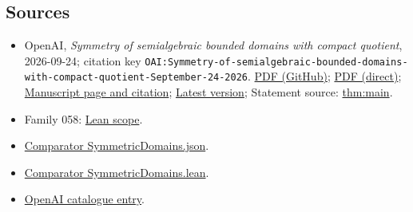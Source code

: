 \documentclass[11pt]{article}
\begin{document}
\subsection{Sources}
\begin{itemize}
\item OpenAI, \emph{Symmetry of semialgebraic bounded domains with compact quotient}, 2026-09-24; citation key \texttt{OAI:Symmetry-of-semialgebraic-bounded-domains-with-compact-quotient-September-24-2026}. \href{https://github.com/openai/math/blob/adc7f1241b42e322a6451854ab7e4b4c146bf78a/preprints/Symmetry-of-semialgebraic-bounded-domains-with-compact-quotient-September-24-2026/paper.pdf}{PDF (GitHub)}; \href{https://github.com/openai/math/raw/adc7f1241b42e322a6451854ab7e4b4c146bf78a/preprints/Symmetry-of-semialgebraic-bounded-domains-with-compact-quotient-September-24-2026/paper.pdf}{PDF (direct)}; \href{https://github.com/openai/math/blob/adc7f1241b42e322a6451854ab7e4b4c146bf78a/preprints/Symmetry-of-semialgebraic-bounded-domains-with-compact-quotient-September-24-2026/README.md}{Manuscript page and citation}; \href{https://github.com/openai/math/blob/main/preprints/Symmetry-of-semialgebraic-bounded-domains-with-compact-quotient-September-24-2026/paper.pdf}{Latest version}; Statement source: \href{https://github.com/openai/math/blob/adc7f1241b42e322a6451854ab7e4b4c146bf78a/preprints/Symmetry-of-semialgebraic-bounded-domains-with-compact-quotient-September-24-2026/build/paper.tex\#L77}{thm:main}.
\item Family 058: \href{https://github.com/openai/math/blob/adc7f1241b42e322a6451854ab7e4b4c146bf78a/lean/docs/058.md}{Lean scope}.
\item \href{https://github.com/openai/math/blob/adc7f1241b42e322a6451854ab7e4b4c146bf78a/lean/ComparatorChallenges/SymmetricDomains.json}{Comparator SymmetricDomains.json}.
\item \href{https://github.com/openai/math/blob/adc7f1241b42e322a6451854ab7e4b4c146bf78a/lean/ComparatorChallenges/SymmetricDomains.lean}{Comparator SymmetricDomains.lean}.
\item \href{https://github.com/openai/math/blob/adc7f1241b42e322a6451854ab7e4b4c146bf78a/CONTENTS.md}{OpenAI catalogue entry}.
\end{itemize}
\end{document}
